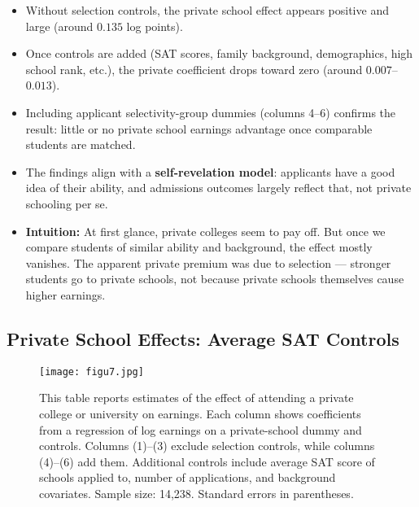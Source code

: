 \documentclass[12pt]{article}
\begin{document}
\begin{itemize}
    \item Without selection controls, the private school effect appears positive and large (around $0.135$ log points).  
    \item Once controls are added (SAT scores, family background, demographics, high school rank, etc.), the private coefficient drops toward zero (around $0.007$–$0.013$).  
    \item Including applicant selectivity-group dummies (columns 4–6) confirms the result: little or no private school earnings advantage once comparable students are matched.  
    \item The findings align with a \textbf{self-revelation model}: applicants have a good idea of their ability, and admissions outcomes largely reflect that, not private schooling per se.  
\end{itemize}

\begin{itemize}
    \item \textbf{Intuition:} At first glance, private colleges seem to pay off. But once we compare students of similar ability and background, the effect mostly vanishes. The apparent private premium was due to selection — stronger students go to private schools, not because private schools themselves cause higher earnings.
\end{itemize}

\subsection*{\noindent\textbf{Private School Effects: Average SAT Controls}}

\begin{figure}[H]
    \centering
    \texttt{[image: figu7.jpg]} %
    \caption*{This table reports estimates of the effect of attending a private college or university 
    on earnings. Each column shows coefficients from a regression of log earnings on a private-school dummy 
    and controls. Columns (1)–(3) exclude selection controls, while columns (4)–(6) add them. 
    Additional controls include average SAT score of schools applied to, number of applications, 
    and background covariates. Sample size: 14,238. Standard errors in parentheses.}
\end{figure}
\end{document}
